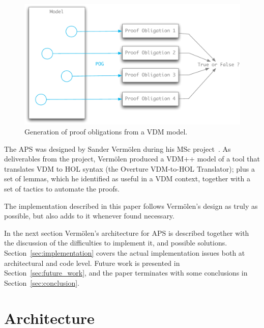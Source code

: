 \documentclass[]{article}
\begin{document}
\begin{figure}
  \begin{center}
    \includegraphics[width=\textwidth]{images/pic_pog.pdf}
    \caption[VDM PO generation]{Generation of proof obligations from a VDM model.}
    \label{fig:sander_arch}
  \end{center}
\end{figure}

The APS was designed by Sander Verm\"olen during his MSc project~\cite{Sander}.
As deliverables from the project, Verm\"olen produced a VDM++ model of a tool that translates VDM to HOL syntax (the Overture VDM-to-HOL Translator); plus a set of lemmas, which he identified as useful in a VDM context, together with a set of tactics to automate the proofs.

The implementation described in this paper follows Verm\"olen's design as truly as possible, but also adds to it whenever found necessary.

In the next section Verm\"olen's architecture for APS is described together with the discussion of the difficulties to implement it, and possible solutions.
Section~\ref{sec:implementation} covers the actual implementation issues both at architectural and code level.
Future work is presented in Section~\ref{sec:future_work}, and the paper terminates with some conclusions in Section~\ref{sec:conclusion}.



\section{Architecture}
\label{sec:intended_architecure}

%
%
\end{document}
